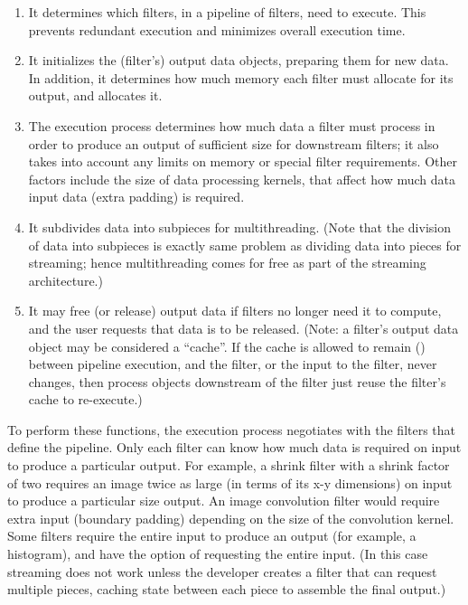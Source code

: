 \begin{enumerate}
        \item It determines which filters, in a pipeline of filters, need to
        execute. This prevents redundant execution and minimizes overall
        execution time.

        \item It initializes the (filter's) output data objects, preparing
        them for new data.  In addition, it determines how much memory each
        filter must allocate for its output, and allocates it.

        \item The execution process determines how much data a filter must
        process in order to produce an output of sufficient size for
        downstream filters; it also takes into account any limits on memory
        or special filter requirements. Other factors include the size of
        data processing kernels, that affect how much data input data 
        (extra padding) is required.

        \item It subdivides data into subpieces for multithreading. (Note
        that the division of data into subpieces is exactly same problem as
        dividing data into pieces for streaming; hence multithreading comes
        for free as part of the streaming architecture.)

        \item It may free (or release) output data if filters no longer need
        it to compute, and the user requests that data is to be
        released. (Note: a filter's output data object may be considered a
        ``cache''. If the cache is allowed to remain () 
        between pipeline execution, and the filter, or the input to the 
        filter, never changes, then process objects downstream of the filter 
        just reuse the filter's cache to re-execute.)
\end{enumerate}

To perform these functions, the execution process negotiates with the
filters that define the pipeline. Only each filter can know how much data is
required on input to produce a particular output. For example, a shrink
filter with a shrink factor of two requires an image twice as large (in terms
of its x-y dimensions) on input to produce a particular size output. An
image convolution filter would require extra input (boundary padding)
depending on the size of the convolution kernel. Some filters require the
entire input to produce an output (for example, a histogram), and have the
option of requesting the entire input. (In this case streaming does not work
unless the developer creates a filter that can request multiple pieces,
caching state between each piece to assemble the final output.)



